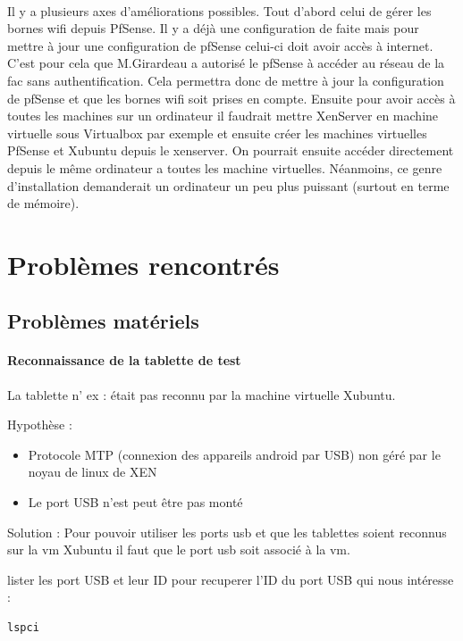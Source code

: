 \documentclass[a4paper,12pt]{extarticle}
\begin{document}
\paragraph{}
Il y a plusieurs axes d’améliorations possibles. 
Tout d’abord celui de gérer les bornes wifi depuis PfSense. Il y a déjà une configuration de faite mais pour mettre à jour une configuration de pfSense celui-ci doit avoir accès à internet. C’est pour cela que M.Girardeau a autorisé le pfSense à accéder au réseau de la fac sans authentification. Cela permettra donc de mettre à jour la configuration de pfSense et que les bornes wifi soit prises en compte. 
Ensuite pour avoir accès à toutes les machines sur un ordinateur il faudrait mettre XenServer en machine virtuelle sous Virtualbox par exemple et ensuite créer les machines virtuelles PfSense et Xubuntu depuis le xenserver. On pourrait ensuite accéder directement depuis le même ordinateur a toutes les machine virtuelles. Néanmoins, ce genre d’installation demanderait un ordinateur un peu plus puissant (surtout en terme de mémoire).

\section{Problèmes rencontrés}

\subsection{Problèmes matériels}

\paragraph{Reconnaissance de la tablette de test\\}
La tablette n’
ex :
était pas reconnu par la machine virtuelle Xubuntu.

Hypothèse :
\begin{itemize}
\item Protocole MTP (connexion des appareils android par USB) non géré par le noyau de linux de XEN
\item Le port USB n’est peut être pas monté \\
\end{itemize}

Solution :
Pour pouvoir utiliser les ports usb et que les tablettes soient reconnus sur la vm Xubuntu il faut que le port usb soit associé à la vm. 

lister les port USB et leur ID pour recuperer l'ID du port USB qui nous intéresse :
\begin{verbatim}
lspci
\end{verbatim}
\end{document}
